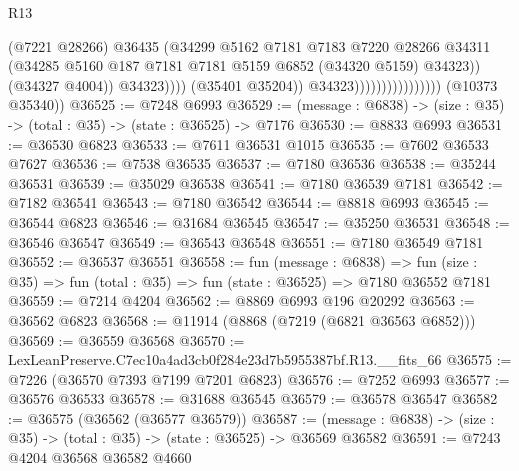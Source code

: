 \begin{lexlean}{R13}
\begin{coremodule}
                                                  (@7221 @28266)
                                                  @36435
                                                  (@34299
                                                    @5162
                                                    @7181
                                                    @7183
                                                    @7220
                                                    @28266
                                                    @34311
                                                    (@34285
                                                      @5160
                                                      @187
                                                      @7181
                                                      @7181
                                                      @5159
                                                      @6852
                                                      (@34320 @5159)
                                                      @34323))
                                                  (@34327 @4004))
                                                @34323))))
                                        (@35401 @35204))
                                      @34323))))))))))))))))
      (@10373 @35340))
@36525 := @7248 @6993
@36529 := (message : @6838) -> (size : @35) -> (total : @35) -> (state : @36525) -> @7176
@36530 := @8833 @6993
@36531 := @36530 @6823
@36533 := @7611 @36531 @1015
@36535 := @7602 @36533 @7627
@36536 := @7538 @36535
@36537 := @7180 @36536
@36538 := @35244 @36531
@36539 := @35029 @36538
@36541 := @7180 @36539 @7181
@36542 := @7182 @36541
@36543 := @7180 @36542
@36544 := @8818 @6993
@36545 := @36544 @6823
@36546 := @31684 @36545
@36547 := @35250 @36531
@36548 := @36546 @36547
@36549 := @36543 @36548
@36551 := @7180 @36549 @7181
@36552 := @36537 @36551
@36558 := fun (message : @6838) =>
  fun (size : @35) => fun (total : @35) => fun (state : @36525) => @7180 @36552 @7181
@36559 := @7214 @4204
@36562 := @8869 @6993 @196 @20292
@36563 := @36562 @6823
@36568 := @11914 (@8868 (@7219 (@6821 @36563 @6852)))
@36569 := @36559 @36568
@36570 := LexLeanPreserve.C7ec10a4ad3cb0f284e23d7b5955387bf.R13.__fits_66
@36575 := @7226 (@36570 @7393 @7199 @7201 @6823)
@36576 := @7252 @6993
@36577 := @36576 @36533
@36578 := @31688 @36545
@36579 := @36578 @36547
@36582 := @36575 (@36562 (@36577 @36579))
@36587 := (message : @6838) -> (size : @35) -> (total : @35) -> (state : @36525) -> @36569 @36582
@36591 := @7243 @4204 @36568 @36582 @4660

\end{coremodule}
\end{lexlean}
